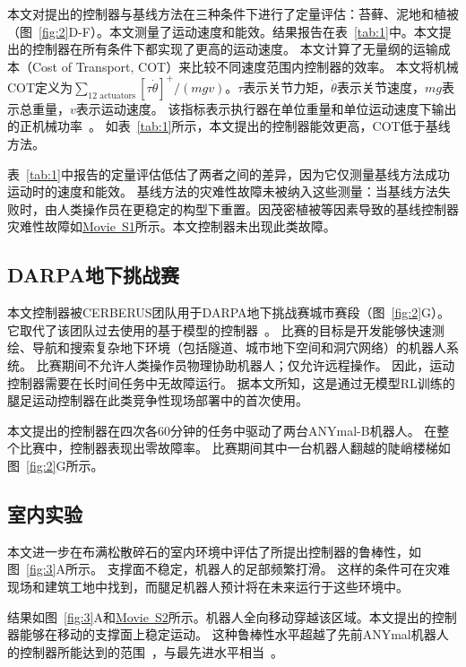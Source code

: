 \documentclass[9pt,twocolumn,twoside]{osajnl}
\begin{document}
本文对提出的控制器与基线方法在三种条件下进行了定量评估：苔藓、泥地和植被（图~\ref{fig:2}D-F）。本文测量了运动速度和能效。结果报告在表~\ref{tab:1}中。本文提出的控制器在所有条件下都实现了更高的运动速度。
本文计算了无量纲的运输成本（Cost of Transport, COT）来比较不同速度范围内控制器的效率。
本文将机械COT定义为$\sum_{\text{12 actuators}}{[\tau \dot{\theta}]^{+}}  / (mgv)$。$\tau$表示关节力矩，$\dot{\theta}$表示关节速度，$mg$表示总重量，$v$表示运动速度。
该指标表示执行器在单位重量和单位运动速度下输出的正机械功率~\cite{collins2005efficient}。
如表~\ref{tab:1}所示，本文提出的控制器能效更高，COT低于基线方法。

表~\ref{tab:1}中报告的定量评估低估了两者之间的差异，因为它仅测量基线方法成功运动时的速度和能效。
基线方法的灾难性故障未被纳入这些测量：当基线方法失败时，由人类操作员在更稳定的构型下重置。因茂密植被等因素导致的基线控制器灾难性故障如\href{https://youtu.be/txjqn8h6pjU}{Movie~S1}所示。本文控制器未出现此类故障。

\subsection*{DARPA地下挑战赛}
本文控制器被CERBERUS团队用于DARPA地下挑战赛城市赛段（图~\ref{fig:2}G）。它取代了该团队过去使用的基于模型的控制器~\cite{bellicoso2018dynamic,jenelten2019dynamic}。
比赛的目标是开发能够快速测绘、导航和搜索复杂地下环境（包括隧道、城市地下空间和洞穴网络）的机器人系统。
比赛期间不允许人类操作员物理协助机器人；仅允许远程操作。
因此，运动控制器需要在长时间任务中无故障运行。
据本文所知，这是通过无模型RL训练的腿足运动控制器在此类竞争性现场部署中的首次使用。

本文提出的控制器在四次各60分钟的任务中驱动了两台ANYmal-B机器人。
在整个比赛中，控制器表现出零故障率。
比赛期间其中一台机器人翻越的陡峭楼梯如图~\ref{fig:2}G所示。

\subsection*{室内实验}
本文进一步在布满松散碎石的室内环境中评估了所提出控制器的鲁棒性，如图~\ref{fig:3}A所示。
支撑面不稳定，机器人的足部频繁打滑。
这样的条件可在灾难现场和建筑工地中找到，而腿足机器人预计将在未来运行于这些环境中。

结果如图~\ref{fig:3}A和\href{https://youtu.be/Xnn4sVSpSh0}{Movie~S2}所示。机器人全向移动穿越该区域。本文提出的控制器能够在移动的支撑面上稳定运动。
这种鲁棒性水平超越了先前ANYmal机器人的控制器所能达到的范围~\cite{bellicoso2018dynamic,jenelten2019dynamic}，与最先进水平相当~\cite{bledt2018contact,vision60blind}。
\end{document}
